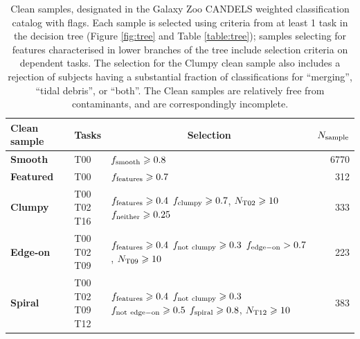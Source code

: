 \documentclass[useAMS,usenatbib]{mn2e}
\begin{document}
{\begin{table}
 \begin{tabular}{@{}lllr}
 \hline
\multicolumn{1}{l}{Clean sample} &
\multicolumn{1}{c}{Tasks} &
\multicolumn{1}{c}{Selection} &
\multicolumn{1}{c}{$N_{\rm sample}$}
\\ 
\hline
\hline
\textbf{Smooth} & T00 & $f_{\rm smooth} \geq 0.8$ & 6770\\ \hline
\textbf{Featured} & T00 & $f_{\rm features} \geq 0.7$ & 312\\ \hline
\textbf{Clumpy} & \parbox[t]{0.75cm}{T00\\T02\\T16} & \parbox[t]{3.5cm}{$f_{\rm features} \geq 0.4$\\$f_{\rm clumpy} \geq 0.7$, $N_{\rm T02} \geq 10$\\$f_{\rm neither} \geq 0.25$} & 333\\ \hline
\textbf{Edge-on} & \parbox[t]{0.75cm}{T00\\T02\\T09} & \parbox[t]{3.5cm}{$f_{\rm features} \geq 0.4$\\$f_{\rm not\ clumpy} \geq 0.3$\\$f_{\rm edge-on} > 0.7$, $N_{\rm T09} \geq 10$} & 223\\ \hline
\textbf{Spiral}  & \parbox[t]{0.75cm}{T00\\T02\\T09\\T12} & \parbox[t]{3.5cm}{$f_{\rm features} \geq 0.4$\\$f_{\rm not\ clumpy} \geq 0.3$\\$f_{\rm not\ edge-on} \geq 0.5$\\$f_{\rm spiral} \geq 0.8$, $N_{\rm T12} \geq 10$} & 383\\ \hline
 \end{tabular}
 \caption{Clean samples, designated in the Galaxy Zoo CANDELS weighted classification catalog with flags. Each sample is selected using criteria from at least 1 task in the decision tree (Figure \ref{fig:tree} and Table \ref{table:tree}); samples selecting for features characterised in lower branches of the tree include selection criteria on dependent tasks. The selection for the Clumpy clean sample also includes a rejection of subjects having a substantial fraction of classifications for ``merging'', ``tidal debris'', or ``both''. The Clean samples are relatively free from contaminants, and are correspondingly incomplete.
\label{table:clean}}
\end{table}



}
\end{document}
